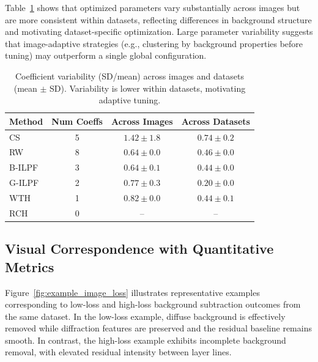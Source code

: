 \documentclass[iucr]{iucrjournals}
\begin{document}
Table~\ref{tab:summary_total_variability} shows that optimized parameters vary substantially across images but are more consistent within datasets, reflecting differences in background structure and motivating dataset-specific optimization.
Large parameter variability suggests that image-adaptive strategies (e.g., clustering by background properties before tuning) may outperform a single global configuration.

\begin{table}[t]
\centering
\small
\caption{Coefficient variability (SD/mean) across images and datasets (mean $\pm$ SD). Variability is lower within datasets, motivating adaptive tuning.}
\label{tab:summary_total_variability}
\begin{tabular}{@{}lccc@{}}
\toprule
Method & Num Coeffs & Across Images & Across Datasets \\
\midrule
CS & 5 & $1.42 \pm 1.8$ & $0.74 \pm 0.2$ \\
RW & 8 & $0.64 \pm 0.0$ & $0.46 \pm 0.0$ \\
B-ILPF & 3 & $0.64 \pm 0.1$ & $0.44 \pm 0.0$ \\
G-ILPF & 2 & $0.77 \pm 0.3$ & $0.20 \pm 0.0$ \\
WTH & 1 & $0.82 \pm 0.0$ & $0.44 \pm 0.1$ \\
RCH & 0 & -- & -- \\
\bottomrule
\end{tabular}
\end{table}


\subsection{Visual Correspondence with Quantitative Metrics}

Figure~\ref{fig:example_image_loss} illustrates representative examples corresponding to low-loss and high-loss background subtraction outcomes from the same dataset. In the low-loss example, diffuse background is effectively removed while diffraction features are preserved and the residual baseline remains smooth. In contrast, the high-loss example exhibits incomplete background removal, with elevated residual intensity between layer lines.
\end{document}
